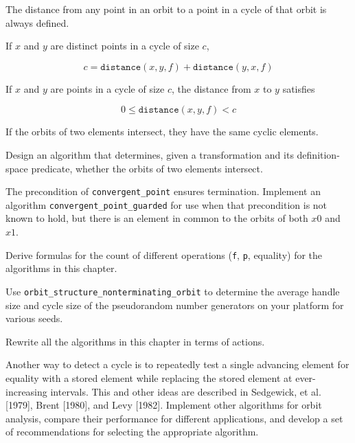 \begin{lemma}
	The distance from any point in an orbit to a point in a cycle
	of that orbit is always defined.
\end{lemma}

\begin{lemma}
	If $x$ and $y$ are distinct points in a cycle of size $c$,
	
	\[ c = \mathtt{distance}(x, y, f) + \mathtt{distance}(y, x, f) \]
\end{lemma}

\begin{lemma}
	If $x$ and $y$ are points in a cycle of size $c$, the distance from $x$
	to $y$ satisfies

	\[ 0 \leq \mathtt{distance}(x, y, f) < c \]
\end{lemma}

\begin{lemma}
	If the orbits of two elements intersect, they have the same
	cyclic elements.
\end{lemma}

\begin{exercise}
	Design an algorithm that determines, given a transformation and its definition-space predicate,
	whether the orbits of two elements intersect.
\end{exercise}

\begin{exercise}
	The precondition of \verb|convergent_point| ensures termination. Implement an algorithm
	\verb|convergent_point_guarded| for use when that precondition is not known to hold, but
	there is an element in common to the orbits of both $x0$ and $x1$.
\end{exercise}

\begin{exercise}
	Derive formulas for the count of different operations (\verb|f|, \verb|p|, equality) for
	the algorithms in this chapter.
\end{exercise}

\begin{exercise}
	Use \verb|orbit_structure_nonterminating_orbit| to determine the average handle size and
	cycle size of the pseudorandom number generators on your platform for various seeds.
\end{exercise}

\begin{exercise}
	Rewrite all the algorithms in this chapter in terms of actions.
\end{exercise}

\begin{project}
	Another way to detect a cycle is to repeatedly test a single advancing element for
	equality with a stored element while replacing the stored element at ever-increasing
	intervals. This and other ideas are described in Sedgewick, et al. [1979], Brent [1980],
	and Levy [1982]. Implement other algorithms for orbit analysis, compare their
	performance for different applications, and develop a set of recommendations for
	selecting the appropriate algorithm.
\end{project}
